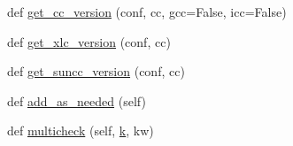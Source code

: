 \begin{DoxyCompactItemize}
\item 
def \hyperlink{namespacewaflib_1_1_tools_1_1c__config_a1a7139cf5457328169035081a4e54237}{get\+\_\+cc\+\_\+version} (conf, cc, gcc=False, icc=False)
\item 
def \hyperlink{namespacewaflib_1_1_tools_1_1c__config_aa104c14551a53eba46cdf5029fa4fe7c}{get\+\_\+xlc\+\_\+version} (conf, cc)
\item 
def \hyperlink{namespacewaflib_1_1_tools_1_1c__config_ac52ede426d901fc009aee1736e3c972c}{get\+\_\+suncc\+\_\+version} (conf, cc)
\item 
def \hyperlink{namespacewaflib_1_1_tools_1_1c__config_a2346d9d7babb7db31efbb64c1ee38fba}{add\+\_\+as\+\_\+needed} (self)
\item 
def \hyperlink{namespacewaflib_1_1_tools_1_1c__config_a2fa8b1e700557368498338d9c4821f37}{multicheck} (self, \hyperlink{rfft2d_test_m_l_8m_adc468c70fb574ebd07287b38d0d0676d}{k}, kw)
\end{DoxyCompactItemize}

